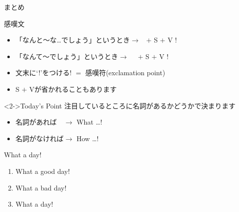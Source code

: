 \documentclass[aspectratio=169,xcolor={dvipsnames,table}]{beamer}
\begin{document}
\begin{frame}[plain]{まとめ}
 
\begin{block}{感嘆文}
\pause
\begin{itemize}[square]\small
 \item \noindent{}「なんと～な\ldots{}でしょう」というとき$\longrightarrow$\,\,\,%
 $+$ S $+$ V !
 \item \noindent{}「なんて～でしょう」というとき$\longrightarrow$\,\,\,%
\,\,\,$+$ S $+$ V !
 \item   文末に`!'をつける\hfill{\scriptsize ! $=$ 感嘆符(exclamation point)}
 \item S $+$ Vが省かれることもあります

\end{itemize}
     \end{block}

\begin{block}<2->{Today's Point}\small
注目しているところに名詞があるかどうかで決まります
\begin{itemize}[square]\small
 \item 名詞があれば　$\longrightarrow$ What \ldots !
 \item 名詞がなければ$\longrightarrow$ How \ldots !
\end{itemize}
\end{block}
\end{frame}

\begin{frame}[plain]{What a day!}
\begin{enumerate}\large
 \item<1-> What a good day!
 \item<2-> What a bad day!
 \item<3-> What a day!
\end{enumerate}
\vfill
 \Huge\centering
{}
\end{frame}
\end{document}
